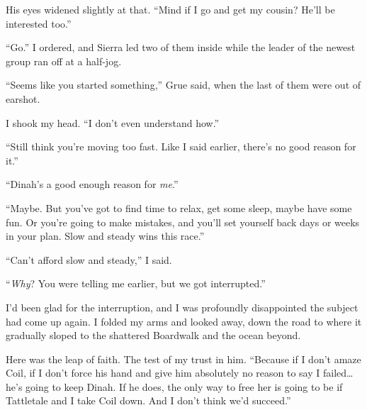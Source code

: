 His eyes widened slightly at that.  ``Mind if I go and get my cousin?  He'll be interested too.''



``Go.''  I ordered, and Sierra led two of them inside while the leader of the newest group ran off at a half-jog.



``Seems like you started something,'' Grue said, when the last of them were out of earshot.



I shook my head.  ``I don't even understand how.''



``Still think you're moving too fast.  Like I said earlier, there's no good reason for it.''



``Dinah's a good enough reason for \emph{me}.''



``Maybe.  But you've got to find time to relax, get some sleep, maybe have some fun.  Or you're going to make mistakes, and you'll set yourself back days or weeks in your plan.  Slow and steady wins this race.''



``Can't afford slow and steady,'' I said.



``\emph{Why}?  You were telling me earlier, but we got interrupted.''



I'd been glad for the interruption, and I was profoundly disappointed the subject had come up again.  I folded my arms and looked away, down the road to where it gradually sloped to the shattered Boardwalk and the ocean beyond.



Here was the leap of faith.  The test of my trust in him.  ``Because if I don't amaze Coil, if I don't force his hand and give him absolutely no reason to say I failed\ldots he's going to keep Dinah.  If he does, the only way to free her is going to be if Tattletale and I take Coil down.  And I don't think we'd succeed.''





